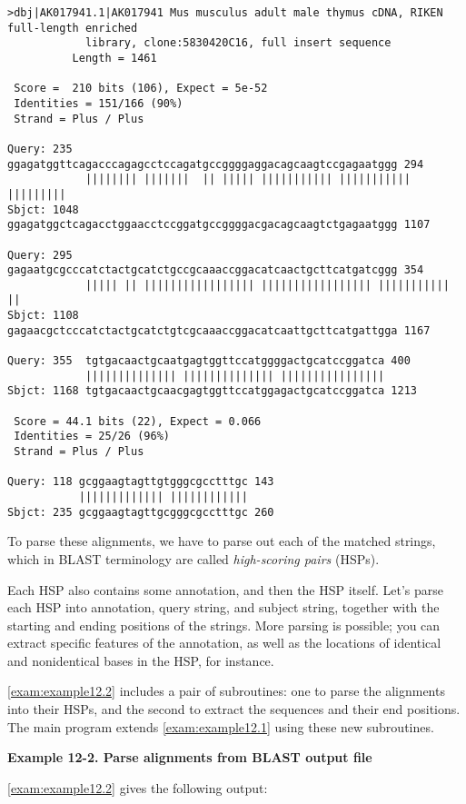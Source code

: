\begin{lstlisting}
>dbj|AK017941.1|AK017941 Mus musculus adult male thymus cDNA, RIKEN
full-length enriched
            library, clone:5830420C16, full insert sequence
          Length = 1461

 Score =  210 bits (106), Expect = 5e-52
 Identities = 151/166 (90%)
 Strand = Plus / Plus

Query: 235  ggagatggttcagacccagagcctccagatgccggggaggacagcaagtccgagaatggg 294
            |||||||| |||||||  || ||||| ||||||||||| ||||||||||| |||||||||
Sbjct: 1048 ggagatggctcagacctggaacctccggatgccggggacgacagcaagtctgagaatggg 1107

Query: 295  gagaatgcgcccatctactgcatctgccgcaaaccggacatcaactgcttcatgatcggg 354
            ||||| || ||||||||||||||||| ||||||||||||||||| ||||||||||| ||
Sbjct: 1108 gagaacgctcccatctactgcatctgtcgcaaaccggacatcaattgcttcatgattgga 1167

Query: 355  tgtgacaactgcaatgagtggttccatggggactgcatccggatca 400
            |||||||||||||| |||||||||||||| ||||||||||||||||
Sbjct: 1168 tgtgacaactgcaacgagtggttccatggagactgcatccggatca 1213

 Score = 44.1 bits (22), Expect = 0.066
 Identities = 25/26 (96%)
 Strand = Plus / Plus

Query: 118 gcggaagtagttgtgggcgcctttgc 143
           ||||||||||||| ||||||||||||
Sbjct: 235 gcggaagtagttgcgggcgcctttgc 260
\end{lstlisting}

To parse these alignments, we have to parse out each of the matched strings, which in BLAST terminology are called \textit{high-scoring pairs} (HSPs).

Each HSP also contains some annotation, and then the HSP itself. Let's parse each HSP into annotation, query string, and subject string, together with the starting and ending positions of the strings. More parsing is possible; you can extract specific features of the annotation, as well as the locations of identical and nonidentical bases in the HSP, for instance.

\autoref{exam:example12.2} includes a pair of subroutines: one to parse the alignments into their HSPs, and the second to extract the sequences and their end positions. The main program extends \autoref{exam:example12.1} using these new subroutines. 

\textbf{Example 12-2. Parse alignments from BLAST output file}


\autoref{exam:example12.2} gives the following output:

